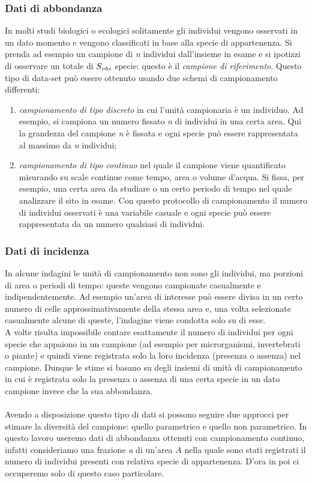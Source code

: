 \subsubsection{Dati di abbondanza}
In molti studi biologici o ecologici solitamente gli individui vengono osservati in un dato momento e vengono classificati in base alla specie di appartenenza. Si prenda ad esempio un campione di \emph{n} individui dall'insieme in esame e si ipotizzi di osservare un totale di $S_\emph{obs}$ specie: questo è il \emph{campione di riferimento}. Questo tipo di data-set può essere ottenuto usando due schemi di campionamento differenti:
\begin{enumerate}
    \item \emph{campionamento di tipo discreto} in cui l'unità campionaria è un individuo. Ad esempio, si campiona un numero fissato \emph{n} di individui in una certa area. Qui la grandezza del campione \emph{n} è fissata e ogni specie può essere rappresentata al massimo da \emph{n} individui;
    
    \item \emph{campionamento di tipo continuo} nel quale il campione viene quantificato misurando su scale continue come tempo, area o volume d'acqua.
    Si fissa, per esempio, una certa area da studiare o un certo periodo di tempo nel quale analizzare il sito in esame. Con questo protocollo di campionamento il numero di individui osservati è una variabile casuale e ogni specie può essere rappresentata da un numero qualsiasi di individui.
\end{enumerate}

\subsubsection{Dati di incidenza}
In alcune indagini le unità di campionamento non sono gli individui, ma porzioni di area o periodi di tempo: queste vengono campionate casualmente e indipendentemente. Ad esempio un'area di interesse può essere divisa in un certo numero di celle approssimativamente della stessa area e, una volta selezionate casualmente alcune di queste, l'indagine viene condotta solo su di esse.\\
A volte risulta impossibile contare esattamente il numero di individui per ogni specie che appaiono in un campione (ad esempio per microrganismi, invertebrati o piante) e quindi viene registrata solo la loro incidenza (presenza o assenza) nel campione. Dunque le stime si basano su degli insiemi di unità di campionamento in cui è registrata solo la presenza o assenza di una certa specie in un dato campione invece che la sua abbondanza.
\\ \\
Avendo a disposizione questo tipo di dati si possono seguire due approcci per stimare la diversità del campione: quello parametrico e quello non parametrico.
In questo lavoro useremo dati di abbondanza ottenuti con campionamento continuo, infatti consideriamo una frazione \emph{a} di un'area $A$ nella quale sono stati registrati il numero di individui presenti con relativa specie di appartenenza. D'ora in poi ci occuperemo solo di questo caso particolare.

